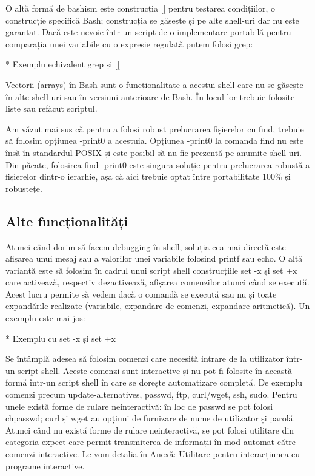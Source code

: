 O altă formă de bashism este construcția [[ pentru testarea condițiilor, o
construcție specifică Bash; construcția se găsește și pe alte shell-uri dar nu
este garantat. Dacă este nevoie într-un script de o implementare portabilă
pentru comparația unei variabile cu o expresie regulată putem folosi grep:

* Exemplu echivalent grep și [[

Vectorii (arrays) în Bash sunt o funcționalitate a acestui shell care nu se
găsește în alte shell-uri sau în versiuni anterioare de Bash. În locul lor
trebuie folosite liste sau refăcut scriptul.

Am văzut mai sus că pentru a folosi robust prelucrarea fișierelor cu find,
trebuie să folosim opțiunea -print0 a acestuia. Opțiunea -print0 la comanda find
nu este însă în standardul POSIX și este posibil să nu fie prezentă pe anumite
shell-uri. Din păcate, folosirea find -print0 este singura soluție pentru
prelucrarea robustă a fișierelor dintr-o ierarhie, așa că aici trebuie optat
între portabilitate 100\% și robustețe.

\subsection{Alte funcționalități}
\label{sec:auto-advancedfunc-other}

Atunci când dorim să facem debugging în shell, soluția cea mai directă este
afișarea unui mesaj sau a valorilor unei variabile folosind printf sau echo. O
altă variantă este să folosim în cadrul unui script shell construcțiile set -x
și set +x care activează, respectiv dezactivează, afișarea comenzilor atunci
când se execută. Acest lucru permite să vedem dacă o comandă se execută sau nu
și toate expandările realizate (variabile, expandare de comenzi, expandare
aritmetică). Un exemplu este mai jos:

* Exemplu cu set -x și set +x

Se întâmplă adesea să folosim comenzi care necesită intrare de la utilizator
într-un script shell. Aceste comenzi sunt interactive și nu pot fi folosite în
această formă într-un script shell în care se dorește automatizare completă. De
exemplu comenzi precum update-alternatives, passwd, ftp, curl/wget, ssh, sudo.
Pentru unele există forme de rulare neinteractivă: în loc de passwd se pot
folosi chpasswd; curl și wget au opțiuni de furnizare de nume de utilizator și
parolă. Atunci când nu există forme de rulare neinteractivă, se pot folosi
utilitare din categoria expect care permit transmiterea de informații în mod
automat către comenzi interactive. Le vom detalia în Anexă: Utilitare pentru
interacțiunea cu programe interactive.

